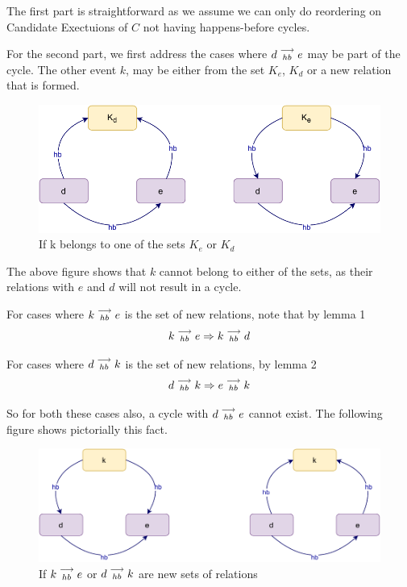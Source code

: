     The first part is straightforward as we assume we can only do reordering on Candidate Exectuions of $C$ not having happens-before cycles. 

    For the second part, we first address the cases where $d\stackrel{\longrightarrow}{_{hb}}e$ may be part of the cycle. The other event $k$, may be either from the set $K_e$, $K_d$ or a new relation that is formed\footnotemark.

    \begin{figure}[H]
        \centering
        \includegraphics[scale=0.7]{InstructionReordering/ValidReorderingProof/ProofParts/Part3/part3(b).pdf}
        \caption{If k belongs to one of the sets $K_e$ or $K_d$}
        \label{fig:my_label}
    \end{figure}

    The above figure shows that $k$ cannot belong to either of the sets, as their relations with $e$ and $d$ will not result in a cycle. 

    For cases where $k\stackrel{\longrightarrow}{_{hb}}e$ is the set of new relations, note that by lemma 1
    \[
        k\stackrel{\longrightarrow}{_{hb}}e \Rightarrow k\stackrel{\longrightarrow}{_{hb}}d
    \]

    For cases where $d\stackrel{\longrightarrow}{_{hb}}k$ is the set of new relations, by lemma 2
    \[
        d\stackrel{\longrightarrow}{_{hb}}k \Rightarrow e\stackrel{\longrightarrow}{_{hb}}k
    \]

    So for both these cases also, a cycle with $d\stackrel{\longrightarrow}{_{hb}}e$ cannot exist. The following figure shows pictorially this fact. 
    \begin{figure}[H]
        \centering
        \includegraphics[scale=0.7]{InstructionReordering/ValidReorderingProof/ProofParts/Part3/part3(c).pdf}
        \caption{If $k\stackrel{\longrightarrow}{_{hb}}e$ or $d\stackrel{\longrightarrow}{_{hb}}k$ are new sets of relations}
        \label{fig:my_label}
    \end{figure}

